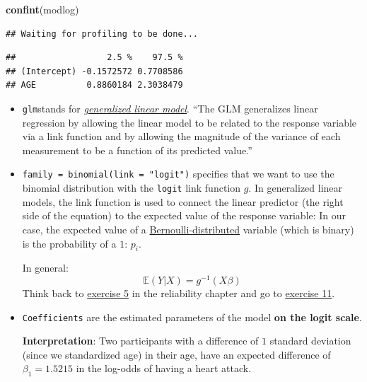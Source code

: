 \documentclass[
]{book}
\newenvironment{Shaded}{\begin{snugshade}}{\end{snugshade}}
\newcommand{\FunctionTok}[1]{\textcolor[rgb]{0.13,0.29,0.53}{\textbf{#1}}}
\newcommand{\NormalTok}[1]{#1}
\begin{document}
\begin{Shaded}
\begin{Highlighting}[]
\FunctionTok{confint}\NormalTok{(modlog)}
\end{Highlighting}
\end{Shaded}

\begin{verbatim}
## Waiting for profiling to be done...
\end{verbatim}

\begin{verbatim}
##                  2.5 %    97.5 %
## (Intercept) -0.1572572 0.7708586
## AGE          0.8860184 2.3038479
\end{verbatim}

\begin{itemize}
\item
  \texttt{glm}stands for
  \href{https://en.wikipedia.org/wiki/Generalized_linear_model}{\emph{generalized linear model}}.
  ``The GLM generalizes linear regression by allowing the linear model to be related to the
  response variable via a link function and by allowing the magnitude of the variance
  of each measurement to be a function of its predicted value.''
\item
  \texttt{family\ =\ binomial(link\ =\ "logit")} specifies that we want to use the
  binomial distribution with the \texttt{logit} link function \(g\).
  In generalized linear models, the link function is used to connect the linear predictor
  (the right side of the equation) to the expected value of the response variable:
  In our case, the expected value of a \href{https://en.wikipedia.org/wiki/Bernoulli_distribution\#:~:text=The\%20Bernoulli\%20distribution\%20is\%20a,not\%20be\%200\%20and\%201.}{Bernoulli-distributed}
  variable (which is binary) is the probability of a \(1\): \(p_i\).

  In general:
  \[\mathbb{E}(Y|X) = g^{-1}(X \beta)\]
  Think back to \href{https://jdegenfellner.github.io/Script_QM3_ZHAW/further-regression-methods.html\#exercise5_LMM}{exercise 5}
  in the reliability chapter and go to \href{exercise11_LMM}{exercise 11}.
\item
  \texttt{Coefficients} are the estimated parameters of the model \textbf{on the logit scale}.

  \textbf{Interpretation}: Two participants with a difference of \(1\) standard
  deviation (since we standardized age) in their age,
  have an expected difference of \(\beta_1 = 1.5215\) in the log-odds of having
  a heart attack.


\end{itemize}
\end{document}

